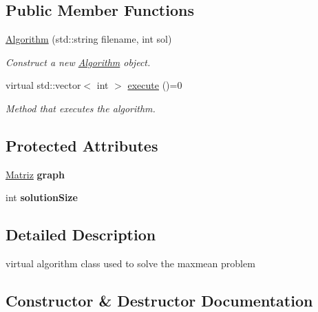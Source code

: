 \subsection*{Public Member Functions}
\begin{DoxyCompactItemize}
\item 
\hyperlink{classAlgorithm_a3c199c8528aae86f06ac515d5102fa09}{Algorithm} (std\+::string filename, int sol)
\begin{DoxyCompactList}\small\item\em Construct a new \hyperlink{classAlgorithm}{Algorithm} object. \end{DoxyCompactList}\item 
virtual std\+::vector$<$ int $>$ \hyperlink{classAlgorithm_af6ea9eb9a6dbd41896e3fd7dabac096b}{execute} ()=0
\begin{DoxyCompactList}\small\item\em Method that executes the algorithm. \end{DoxyCompactList}\end{DoxyCompactItemize}
\subsection*{Protected Attributes}
\begin{DoxyCompactItemize}
\item 
\mbox{\label{classAlgorithm_ac738351f4331aee2fb965f689b7be273}} 
\hyperlink{classMatriz}{Matriz} {\bfseries graph}
\item 
\mbox{\label{classAlgorithm_a605f2288613c21d986485ec0feef6851}} 
int {\bfseries solution\+Size}
\end{DoxyCompactItemize}


\subsection{Detailed Description}
virtual algorithm class used to solve the maxmean problem 

\subsection{Constructor \& Destructor Documentation}
\mbox{\label{classAlgorithm_a3c199c8528aae86f06ac515d5102fa09}} 
